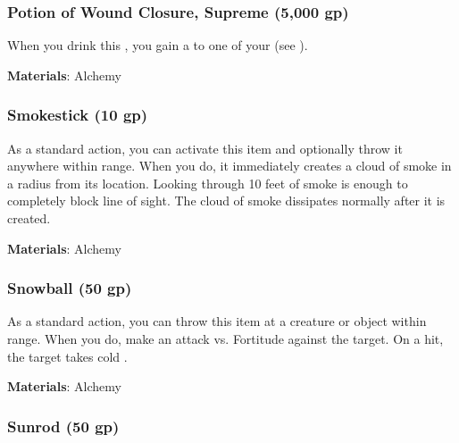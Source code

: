 \lowercase{\hypertarget{item:Potion of Wound Closure, Supreme}{}}\label{item:Potion of Wound Closure, Supreme}
\hypertarget{item:Potion of Wound Closure, Supreme}{\subsubsection{Potion of Wound Closure, Supreme\hfill{} (5,000 gp)}}

When you drink this , you gain a   to one of your  (see ).



\vspace{0.25em}
\textbf{Materials}: Alchemy


\lowercase{\hypertarget{item:Smokestick}{}}\label{item:Smokestick}
\hypertarget{item:Smokestick}{\subsubsection{Smokestick\hfill{} (10 gp)}}

As a standard action, you can activate this item and optionally throw it anywhere within \rngclose range.
When you do, it immediately creates a cloud of smoke in a \areasmall radius from its location.
Looking through 10 feet of smoke is enough to completely block line of sight.
The cloud of smoke dissipates normally after it is created.



\vspace{0.25em}
\textbf{Materials}: Alchemy


\lowercase{\hypertarget{item:Snowball}{}}\label{item:Snowball}
\hypertarget{item:Snowball}{\subsubsection{Snowball\hfill{} (50 gp)}}

As a standard action, you can throw this item at a creature or object within \rngclose range.
When you do, make an attack vs. Fortitude against the target.
On a hit, the target takes cold .



\vspace{0.25em}
\textbf{Materials}: Alchemy


\lowercase{\hypertarget{item:Sunrod}{}}\label{item:Sunrod}
\hypertarget{item:Sunrod}{\subsubsection{Sunrod\hfill{} (50 gp)}}

